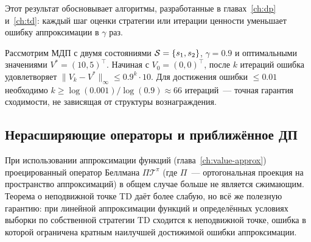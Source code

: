 Этот результат обосновывает алгоритмы, разработанные в главах~\ref{ch:dp} и~\ref{ch:td}: каждый шаг оценки стратегии или итерации ценности уменьшает ошибку аппроксимации в $\gamma$ раз.

\begin{example}
Рассмотрим МДП с двумя состояниями $\mathcal{S} = \{s_1, s_2\}$, $\gamma = 0.9$ и оптимальными значениями $V^* = (10, 5)^\top$. Начиная с $V_0 = (0,0)^\top$, после $k$ итераций ошибка удовлетворяет $\|V_k - V^*\|_\infty \leq 0.9^k \cdot 10$. Для достижения ошибки $\leq 0.01$ необходимо $k \geq \log(0.001)/\log(0.9) \approx 66$ итераций~--- точная гарантия сходимости, не зависящая от структуры вознаграждения.
\end{example}

\subsection*{Нерасширяющие операторы и приближённое ДП}

При использовании аппроксимации функций (глава~\ref{ch:value-approx}) проецированный оператор Беллмана $\Pi \mathcal{T}^\pi$ (где $\Pi$~--- ортогональная проекция на пространство аппроксимаций) в общем случае больше не является сжимающим. Теорема о неподвижной точке TD даёт более слабую, но всё же полезную гарантию: при линейной аппроксимации функций и определённых условиях выборки по собственной стратегии TD сходится к неподвижной точке, ошибка в которой ограничена кратным наилучшей достижимой ошибки аппроксимации.

